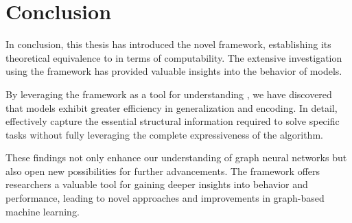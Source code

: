 \section{Conclusion}
In conclusion, this thesis has introduced the novel \wlnn framework, establishing its theoretical equivalence to \gnns in terms of computability. The extensive investigation using the \wlnn framework has provided valuable insights into the behavior of \gnn models.

By leveraging the \wlnn framework as a tool for understanding \gnns, we have discovered that \gnn models exhibit greater efficiency in generalization and encoding. In detail, \gnns effectively capture the essential structural information required to solve specific tasks without fully leveraging the complete expressiveness of the \wl algorithm.

These findings not only enhance our understanding of graph neural networks but also open new possibilities for further advancements. The \wlnn framework offers researchers a valuable tool for gaining deeper insights into \gnn behavior and performance, leading to novel approaches and improvements in graph-based machine learning.
